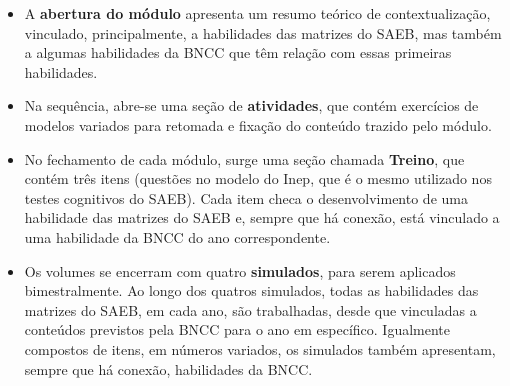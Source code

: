 \begin{itemize}
\item
  A \textbf{abertura do módulo} apresenta um resumo teórico de
  contextualização, vinculado, principalmente, a habilidades das
  matrizes do SAEB, mas também a algumas habilidades da BNCC que têm
  relação com essas primeiras habilidades.
\item
  Na sequência, abre-se uma seção de \textbf{atividades}, que contém
  exercícios de modelos variados para retomada e fixação
  do conteúdo trazido pelo módulo.
\item
  No fechamento de cada módulo, surge uma seção chamada \textbf{Treino},
  que contém três itens (questões no modelo do Inep, que é o mesmo
  utilizado nos testes cognitivos do SAEB). Cada item checa o
  desenvolvimento de uma habilidade das matrizes do SAEB e, sempre que
  há conexão, está vinculado a uma habilidade da BNCC do ano
  correspondente.
\item
  Os volumes se encerram com quatro \textbf{simulados}, para serem
  aplicados bimestralmente. Ao longo dos quatros simulados, todas as
  habilidades das matrizes do SAEB, em cada ano, são trabalhadas, desde
  que vinculadas a conteúdos previstos pela BNCC para o ano em
  específico. Igualmente compostos de itens, em números variados, os
  simulados também apresentam, sempre que há conexão, habilidades da
  BNCC.
\end{itemize}
